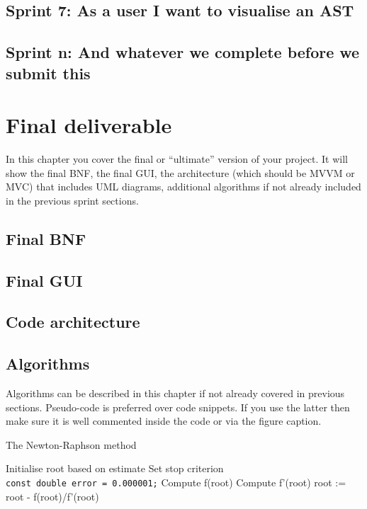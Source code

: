 \documentclass[a4paper, oneside, 11pt]{report}
\begin{document}
\section{Sprint 7: As a user I want to visualise an AST}
\section{Sprint n: And whatever we complete before we submit this}



\chapter{Final deliverable}\label{Impl}

In this chapter you cover the final or ``ultimate'' version of your project. It will show the final BNF, the final GUI, the architecture (which should be MVVM or MVC) that includes UML diagrams, additional algorithms if not already included in the previous sprint sections.

\section{Final BNF}

\section{Final GUI}

\section{Code architecture}

\section{Algorithms}

Algorithms can be described in this chapter if not already covered in previous sections. Pseudo-code is preferred over code snippets. If you use the latter then make sure it is well commented inside the code or via the figure caption. 

\begin{algorithm}[th]
\caption{ The Newton-Raphson method }
\begin{algorithmic}[1]
\STATE Initialise root based on estimate
\STATE Set stop criterion
\\ \texttt{const double error = 0.000001;}
	\STATE Compute f(root)
	\STATE Compute f'(root)
	\STATE root := root - f(root)/f'(root)
\ENDWHILE
\end{algorithmic}
\end{algorithm}
\end{document}
